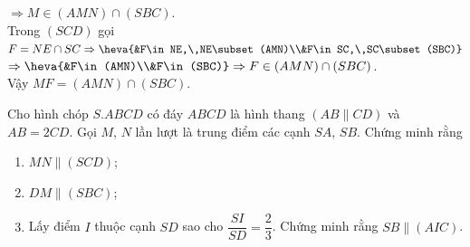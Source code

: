 \begin{bt}
{\begin{enumerate}
				$\Rightarrow M\in (AMN)\cap (SBC)$.\\
				Trong $(SCD)$ gọi $F=NE\cap SC\Rightarrow \heva{&F\in NE,\,NE\subset (AMN)\\&F\in SC,\,SC\subset (SBC)}$\\
				$\Rightarrow\heva{&F\in (AMN)\\&F\in (SBC)}\Rightarrow F\in (AMN)\cap (SBC)$.\\
				Vậy $MF=(AMN)\cap (SBC)$.
			\end{enumerate}
	}
\end{bt}

\begin{bt}%
	Cho hình chóp $S.ABCD$ có đáy $ABCD$ là hình thang $(AB\parallel CD)$ và $AB=2CD$. Gọi $M$, $N$ lần lượt là trung điểm các cạnh $SA$, $SB$. Chứng minh rằng
	\begin{enumerate}
		\item $MN\parallel (SCD)$;
		\item $DM\parallel (SBC)$;
		\item Lấy điểm $I$ thuộc cạnh $SD$ sao cho $\dfrac{SI}{SD}=\dfrac{2}{3}$. Chứng minh rằng $SB\parallel (AIC)$.
	\end{enumerate}
\end{bt}
